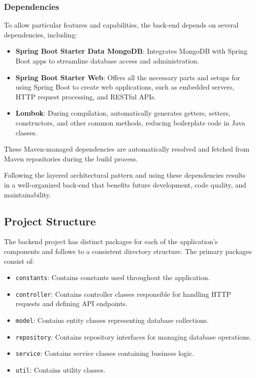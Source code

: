 \documentclass[conference]{IEEEtran}
\begin{document}
\subsubsection{Dependencies}
To allow particular features and capabilities, the back-end depends on several dependencies, including:

\begin{itemize} \item \textbf{Spring Boot Starter Data MongoDB}: Integrates MongoDB with Spring Boot apps to streamline database access and administration.
    
    \item \textbf{Spring Boot Starter Web}: Offers all the necessary parts and setups for using Spring Boot to create web applications, such as embedded servers, HTTP request processing, and RESTful APIs.
    
    \item \textbf{Lombok}: During compilation, automatically generates getters, setters, constructors, and other common methods, reducing boilerplate code in Java classes.
\end{itemize}

These Maven-managed dependencies are automatically resolved and fetched from Maven repositories during the build process.

Following the layered architectural pattern and using these dependencies results in a well-organized back-end that benefits future development, code quality, and maintainability.



\subsection{Project Structure}

The backend project has distinct packages for each of the application's components and follows to a consistent directory structure. The primary packages consist of:

\begin{itemize}
    \item \texttt{constants}: Contains constants used throughout the application.
    \item \texttt{controller}: Contains controller classes responsible for handling HTTP requests and defining API endpoints.
    \item \texttt{model}: Contains entity classes representing database collections.
    \item \texttt{repository}: Contains repository interfaces for managing database operations.
    \item \texttt{service}: Contains service classes containing business logic.
    \item \texttt{util}: Contains utility classes.
\end{itemize}
\end{document}
